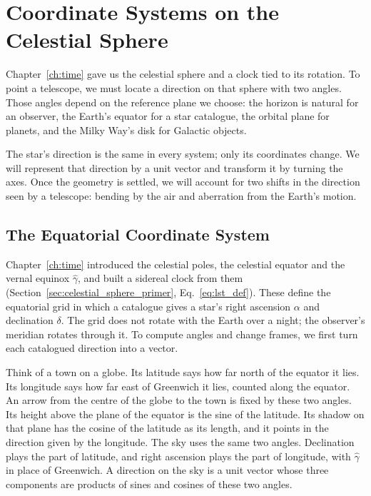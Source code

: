 \chapter{Coordinate Systems on the Celestial Sphere}
\label{ch:coords}

Chapter~\ref{ch:time} gave us the celestial sphere and a clock tied to its rotation. To point a telescope, we must locate a direction on that sphere with two angles. Those angles depend on the reference plane we choose: the horizon is natural for an observer, the Earth's equator for a star catalogue, the orbital plane for planets, and the Milky Way's disk for Galactic objects.

The star's direction is the same in every system; only its coordinates change. We will represent that direction by a unit vector and transform it by turning the axes. Once the geometry is settled, we will account for two shifts in the direction seen by a telescope: bending by the air and aberration from the Earth's motion.

\section{The Equatorial Coordinate System}
\label{co:sec:equatorial}

Chapter~\ref{ch:time} introduced the celestial poles, the celestial equator and the vernal equinox $\hat\gamma$, and built a sidereal clock from them (Section~\ref{sec:celestial_sphere_primer}, Eq.~\eqref{eq:lst_def}). These define the equatorial grid in which a catalogue gives a star's right ascension $\alpha$ and declination $\delta$. The grid does not rotate with the Earth over a night; the observer's meridian rotates through it. To compute angles and change frames, we first turn each catalogued direction into a vector.

Think of a town on a globe. Its latitude says how far north of the equator it lies. Its longitude says how far east of Greenwich it lies, counted along the equator. An arrow from the centre of the globe to the town is fixed by these two angles. Its height above the plane of the equator is the sine of the latitude. Its shadow on that plane has the cosine of the latitude as its length, and it points in the direction given by the longitude. The sky uses the same two angles. Declination plays the part of latitude, and right ascension plays the part of longitude, with $\hat\gamma$ in place of Greenwich. A direction on the sky is a unit vector whose three components are products of sines and cosines of these two angles.

